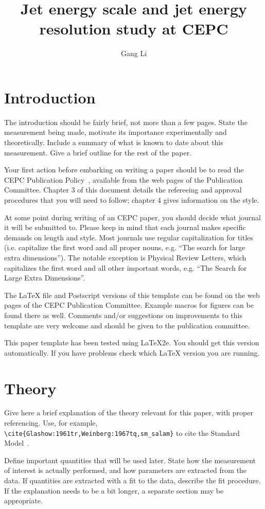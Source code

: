 \documentclass[11pt,a4paper]{cepcnote}
\title{ Jet energy scale and jet energy resolution study at CEPC }
\author{Gang Li}
\begin{document}
\tableofcontents
\clearpage

\section{Introduction}

The introduction should be fairly brief, not more than a few pages.
State the measurement being made, motivate its importance
experimentally and theoretically. Include a summary of what is known
to date about this measurement. Give a brief outline for the rest of
the paper.

Your first action before embarking on writing a paper should be to
read the CEPC Publication Policy~\cite{publication_policy}, available
from the web pages of the Publication Committee. Chapter 3 of this
document details the refereeing and approval procedures that you will
need to follow; chapter 4 gives information on the style.

At some point during writing of an CEPC paper, you should decide what
journal it will be submitted to.  Please keep in mind that each
journal makes specific demands on length and style.  Most journals use
regular capitalization for titles (i.e. capitalize the first word and
all proper nouns, e.g. ``The search for large extra dimensions''). The
notable exception is Physical Review Letters, which capitalizes the
first word and all other important words, e.g. ``The Search for Large
Extra Dimensions''.

The \LaTeX{} file and Postscript versions of this template can be
found on the web pages of the CEPC Publication Committee. Example
macros for figures can be found there as well.  Comments and/or
suggestions on improvements to this template are very welcome and
should be given to the publication committee.

This paper template has been tested using \LaTeX{}2e.  You should get
this version automatically. If you have problems check which \LaTeX{}
version you are running.

\section{Theory}

Give here a brief explanation of the theory relevant for this paper,
with proper referencing. Use, for example,
\verb|\cite{Glashow:1961tr,Weinberg:1967tq,sm_salam}| to cite the
Standard Model~\cite{Glashow:1961tr,Weinberg:1967tq,sm_salam}.

Define important quantities that will be used later.  State how the
measurement of interest is actually performed, and how parameters are
extracted from the data.  If quantities are extracted with a fit to
the data, describe the fit procedure. If the explanation needs to be a
bit longer, a separate section may be appropriate.
\end{document}
